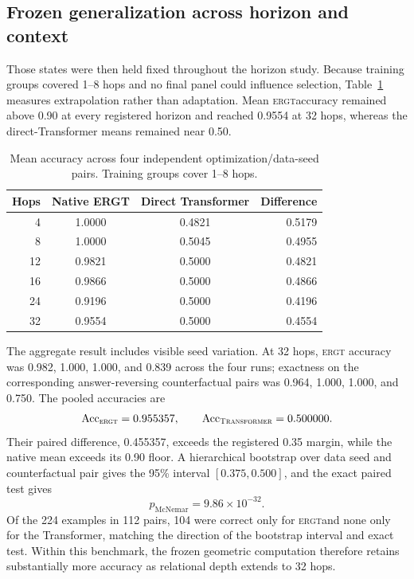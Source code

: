 \documentclass[11pt]{article}
\newcommand{\ERGT}{\textsc{ergt}}
\newcommand{\TF}{\textsc{Transformer}}
\begin{document}
\subsection{Frozen generalization across horizon and context}

Those states were then held fixed throughout the horizon study. Because
training groups covered 1--8 hops and no final panel could influence selection,
Table~\ref{tab:horizon} measures extrapolation rather than adaptation. Mean
\ERGT accuracy remained above 0.90 at every registered horizon and reached
0.9554 at 32 hops, whereas the direct-Transformer means remained near 0.50.

\begin{table}[t]
\centering
\caption{Mean accuracy across four independent optimization/data-seed pairs.
Training groups cover 1--8 hops.}
\label{tab:horizon}
\begin{tabular}{@{}rccr@{}}
\toprule
Hops & Native ERGT & Direct Transformer & Difference \\
\midrule
4  & 1.0000 & 0.4821 & 0.5179 \\
8  & 1.0000 & 0.5045 & 0.4955 \\
12 & 0.9821 & 0.5000 & 0.4821 \\
16 & 0.9866 & 0.5000 & 0.4866 \\
24 & 0.9196 & 0.5000 & 0.4196 \\
32 & 0.9554 & 0.5000 & 0.4554 \\
\bottomrule
\end{tabular}
\end{table}

The aggregate result includes visible seed variation. At 32 hops, \ERGT
accuracy was 0.982, 1.000, 1.000, and 0.839 across the four runs; exactness on
the corresponding answer-reversing counterfactual pairs was 0.964, 1.000,
1.000, and 0.750. The pooled accuracies are
\[
\operatorname{Acc}_{\ERGT}=0.955357,
\qquad
\operatorname{Acc}_{\TF}=0.500000.
\]
Their paired difference, 0.455357, exceeds the registered 0.35 margin, while
the native mean exceeds its 0.90 floor. A hierarchical bootstrap over data
seed and counterfactual pair gives the 95\% interval $[0.375,0.500]$, and the
exact paired test gives
\[
p_{\mathrm{McNemar}}=9.86\times10^{-32}.
\]
Of the 224 examples in 112 pairs, 104 were correct only for \ERGT and none
only for the Transformer, matching the direction of the bootstrap interval and
exact test. Within this benchmark, the frozen geometric computation therefore
retains substantially more accuracy as relational depth extends to 32 hops.
\end{document}
